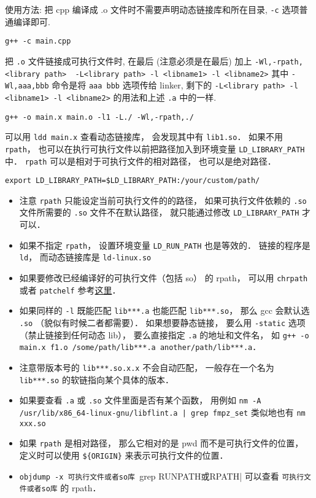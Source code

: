 使用方法:
把 cpp 编译成 .o 文件时不需要声明动态链接库和所在目录, \verb`-c` 选项普通编译即可.
\begin{lstlisting}[language=none]
g++ -c main.cpp
\end{lstlisting}
把 \verb|.o| 文件链接成可执行文件时, 在最后 (注意必须是在最后) 加上
\verb`-Wl,-rpath,<library path>  -L<library path> -l <libname1> -l <libname2>`
其中 \verb`-Wl,aaa,bbb` 命令是将 \verb`aaa bbb` 选项传给 linker, 剩下的 \verb`-L<library path> -l <libname1> -l <libname2>` 的用法和上述 \verb|.a| 中的一样.
\begin{lstlisting}[language=none]
g++ -o main.x main.o -l1 -L./ -Wl,-rpath,./
\end{lstlisting}
可以用 \verb|ldd main.x| 查看动态链接库， 会发现其中有 \verb|lib1.so|． 如果不用 \verb|rpath|， 也可以在执行可执行文件以前把路径加入到环境变量 \verb`LD_LIBRARY_PATH` 中． \verb|rpath| 可以是相对于可执行文件的相对路径， 也可以是绝对路径．
\begin{lstlisting}[language=none]
export LD_LIBRARY_PATH=$LD_LIBRARY_PATH:/your/custom/path/
\end{lstlisting}
\begin{itemize}
\item 注意 \verb|rpath| 只能设定当前可执行文件的的路径， 如果可执行文件依赖的 \verb|.so| 文件所需要的 \verb|.so| 文件不在默认路径， 就只能通过修改 \verb`LD_LIBRARY_PATH` 才可以．
\item 如果不指定 \verb|rpath|， 设置环境变量 \verb|LD_RUN_PATH| 也是等效的． 链接的程序是 \verb|ld|， 而动态链接库是 \verb|ld-linux.so|
\item 如果要修改已经编译好的可执行文件（包括 so） 的 rpath， 可以用 \verb|chrpath| 或者 \verb|patchelf| 参考\href{https://stackoverflow.com/questions/13769141/can-i-change-rpath-in-an-already-compiled-binary}{这里}．
\item 如果同样的 \verb`-l` 既能匹配 \verb`lib***.a` 也能匹配 \verb`lib***.so`， 那么 gcc 会默认选 \verb`.so` （貌似有时候二者都需要）． 如果想要静态链接， 要么用 \verb`-static` 选项（禁止链接到任何动态 lib）， 要么直接指定 \verb`.a` 的地址和文件名， 如 \verb`g++ -o main.x f1.o /some/path/lib***.a another/path/lib***.a`．
\item 注意带版本号的 \verb|lib***.so.x.x| 不会自动匹配， 一般存在一个名为 \verb|lib***.so| 的软链指向某个具体的版本．
\item 如果要查看 \verb|.a| 或 \verb|.so| 文件里面是否有某个函数， 用例如 \verb`nm -A /usr/lib/x86_64-linux-gnu/libflint.a | grep fmpz_set` 类似地也有 \verb|nm xxx.so|
\item 如果 \verb|rpath| 是相对路径， 那么它相对的是 pwd 而不是可执行文件的位置， 定义时可以使用 \verb|${ORIGIN}| 来表示可执行文件的位置．
\item \verb|objdump -x 可执行文件或者so库 |grep RUNPATH或RPATH| 可以查看 \verb|可执行文件或者so库| 的 rpath．
\end{itemize}

